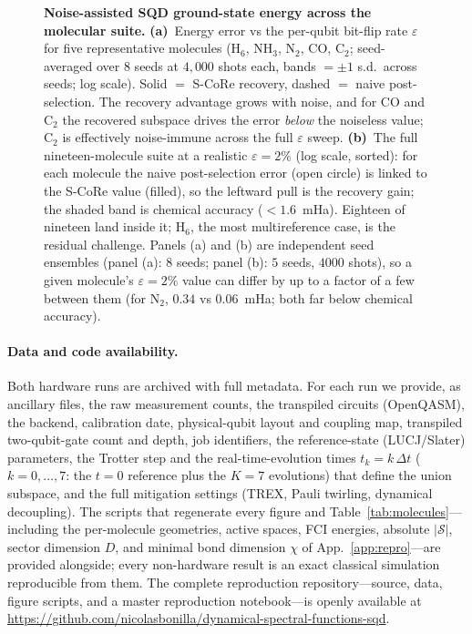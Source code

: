 \begin{figure}[htbp]\centering
\caption{\textbf{Noise-assisted SQD ground-state energy across the molecular suite.}
\textbf{(a)}~Energy error vs the per-qubit bit-flip rate $\varepsilon$ for five representative molecules
($\mathrm{H_6}$, $\mathrm{NH_3}$, $\mathrm{N_2}$, CO, $\mathrm{C_2}$; seed-averaged over $8$ seeds at $4{,}000$ shots each, bands $=\pm1$ s.d.\ across seeds; log scale). Solid $=$ S-CoRe recovery, dashed $=$ naive
post-selection. The recovery advantage grows with noise, and for $\mathrm{CO}$ and $\mathrm{C_2}$ the
recovered subspace drives the error \emph{below} the noiseless value; $\mathrm{C_2}$ is
effectively noise-immune across the full $\varepsilon$ sweep. \textbf{(b)}~The full nineteen-molecule suite at a realistic
$\varepsilon=2\%$ (log scale, sorted): for each molecule the naive post-selection error (open circle) is
linked to the S-CoRe value (filled), so the leftward pull is the recovery gain; the shaded band is
chemical accuracy ($<1.6$~mHa). Eighteen of nineteen land inside it; $\mathrm{H_6}$, the most
multireference case, is the residual challenge. Panels (a) and (b) are independent seed ensembles
(panel (a): $8$ seeds; panel (b): $5$ seeds, $4000$ shots), so a given molecule's $\varepsilon=2\%$ value
can differ by up to a factor of a few between them (for $\mathrm{N_2}$, $0.34$ vs $0.06$~mHa; both far below chemical accuracy).}\label{fig:noiserec}\end{figure}

\paragraph{Data and code availability.} Both hardware runs are archived with full metadata. For each run
we provide, as ancillary files, the raw measurement counts, the transpiled circuits (OpenQASM), the
backend, calibration date, physical-qubit layout and coupling map, transpiled two-qubit-gate count and
depth, job identifiers, the reference-state (LUCJ/Slater) parameters, the Trotter step and the
real-time-evolution times $t_k=k\,\Delta t$ ($k=0,\dots,7$: the $t=0$ reference plus the $K=7$ evolutions)
that define the union subspace, and the full mitigation settings (TREX, Pauli twirling, dynamical decoupling). The scripts that regenerate every
figure and Table~\ref{tab:molecules}---including the per-molecule geometries, active spaces, FCI energies,
absolute $|\mathcal S|$, sector dimension $D$, and minimal bond dimension $\chi$ of
App.~\ref{app:repro}---are provided alongside; every non-hardware result is an exact classical simulation
reproducible from them. The complete reproduction repository---source, data, figure scripts, and a master
reproduction notebook---is openly available at \url{https://github.com/nicolasbonilla/dynamical-spectral-functions-sqd}.
